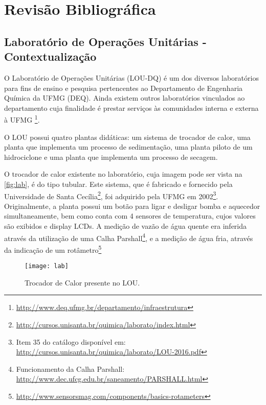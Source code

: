 \chapter{Revisão Bibliográfica}
	
	\section{Laboratório de Operações Unitárias - Contextualização}
		O Laboratório de Operações Unitárias (LOU-DQ) é um dos diversos laboratórios para fins de ensino e pesquisa pertencentes ao Departamento de Engenharia Química da UFMG (DEQ). Ainda existem outros laboratórios vinculados ao departamento cuja finalidade é prestar serviços às comunidades interna e externa à UFMG \footnote{\url{http://www.deq.ufmg.br/departamento/infraestrutura}}.
		
		O LOU possui quatro plantas didáticas: um sistema de trocador de calor, uma planta que implementa um processo de sedimentação, uma planta piloto de um hidrociclone e uma planta que implementa um processo de secagem.
		
		O trocador de calor existente no laboratório, cuja imagem pode ser vista na \autoref{fig:lab}, é do tipo tubular. Este sistema, que é fabricado e fornecido pela Universidade de Santa Cecília\footnote{\url{http://cursos.unisanta.br/quimica/laborato/index.html}}, foi adquirido pela UFMG em 2002\footnote{Item 35 do catálogo disponível em: \url{http://cursos.unisanta.br/quimica/laborato/LOU-2016.pdf}}. Originalmente, a planta possui um botão para ligar e desligar bomba e aquecedor simultaneamente, bem como conta com 4 sensores de temperatura, cujos valores são exibidos e display LCDs. A medição de vazão de água quente era inferida através da utilização de uma Calha Parshall\footnote{Funcionamento da Calha Parshall: \url{http://www.dec.ufcg.edu.br/saneamento/PARSHALL.html}}, e a medição de água fria, através da indicação de um rotâmetro\footnote{\url{http://www.sensorsmag.com/components/basics-rotameters}}
		
		\begin{figure}[!htb]
			\centering
			\texttt{[image: lab]}  %
			\caption{Trocador de Calor presente no LOU.}
			\label{fig:lab}
		\end{figure}

